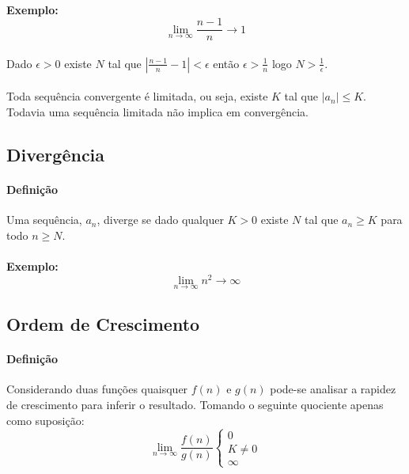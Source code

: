 \documentclass{article}
\begin{document}
            \paragraph{}\textbf{Exemplo:}
                \begin{equation}
                    \lim_{n\to\infty}\frac{n-1}{n}\rightarrow1
                \end{equation}
            \paragraph{}Dado $\epsilon>0$ existe $N$ tal que $|\frac{n-1}{n}-1|<\epsilon$ então $\epsilon>\frac{1}{n}$ logo $N>\frac{1}{\epsilon}$.
            \paragraph{} Toda sequência convergente é limitada, ou seja, existe $K$ tal que $|a_{n}| \le K$. Todavia uma sequência limitada não implica em convergência.
        
        \subsection{Divergência}
            \paragraph{Definição}Uma sequência, $a_{n}$, diverge se dado qualquer $K>0$ existe $N$ tal que $a_{n} \ge K$ para todo $n \ge N$.
            \paragraph{}\textbf{Exemplo:} 
                \begin{equation}
                    \lim_{n\to\infty}n^{2} \rightarrow \infty
                \end{equation}
        
        \subsection{Ordem de Crescimento}
            \paragraph{Definição}Considerando duas funções quaisquer $f(n)$ e $g(n)$ pode-se analisar a rapidez de crescimento para inferir o resultado. Tomando o seguinte quociente apenas como suposição:
                \begin{equation}
                    \lim\limits_{n\to\infty}\frac{f(n)}{g(n)}\left \{ \begin{matrix} 0\\ K\ne0\\ \infty\end{matrix}\right.
                \end{equation}
\end{document}
